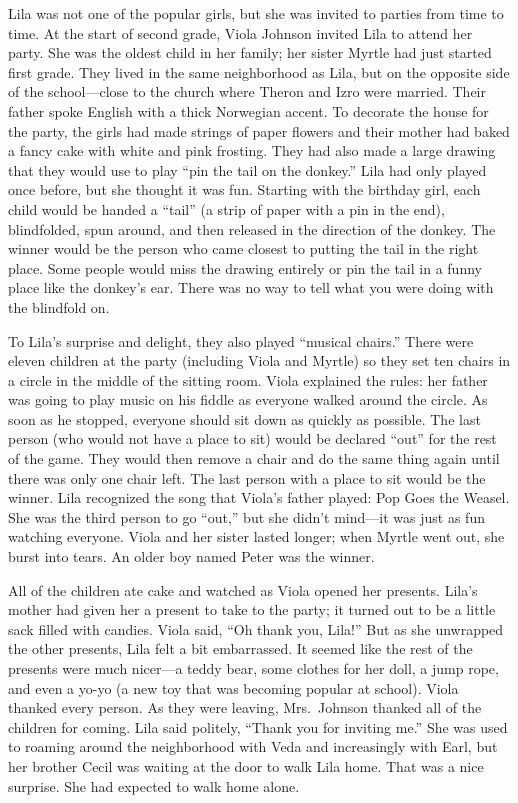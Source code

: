 \documentclass[
  letterpaper,
]{book}
\begin{document}
Lila was not one of the popular girls, but she was invited to parties
from time to time. At the start of second grade, Viola Johnson invited
Lila to attend her party. She was the oldest child in her family; her
sister Myrtle had just started first grade. They lived in the same
neighborhood as Lila, but on the opposite side of the school---close to
the church where Theron and Izro were married. Their father spoke
English with a thick Norwegian accent. To decorate the house for the
party, the girls had made strings of paper flowers and their mother had
baked a fancy cake with white and pink frosting. They had also made a
large drawing that they would use to play ``pin the tail on the
donkey.'' Lila had only played once before, but she thought it was fun.
Starting with the birthday girl, each child would be handed a ``tail''
(a strip of paper with a pin in the end), blindfolded, spun around, and
then released in the direction of the donkey. The winner would be the
person who came closest to putting the tail in the right place. Some
people would miss the drawing entirely or pin the tail in a funny place
like the donkey's ear. There was no way to tell what you were doing with
the blindfold on.

To Lila's surprise and delight, they also played ``musical chairs.''
There were eleven children at the party (including Viola and Myrtle) so
they set ten chairs in a circle in the middle of the sitting room. Viola
explained the rules: her father was going to play music on his fiddle as
everyone walked around the circle. As soon as he stopped, everyone
should sit down as quickly as possible. The last person (who would not
have a place to sit) would be declared ``out'' for the rest of the game.
They would then remove a chair and do the same thing again until there
was only one chair left. The last person with a place to sit would be
the winner. Lila recognized the song that Viola's father played: Pop
Goes the Weasel. She was the third person to go ``out,'' but she didn't
mind---it was just as fun watching everyone. Viola and her sister lasted
longer; when Myrtle went out, she burst into tears. An older boy named
Peter was the winner.

All of the children ate cake and watched as Viola opened her presents.
Lila's mother had given her a present to take to the party; it turned
out to be a little sack filled with candies. Viola said, ``Oh thank you,
Lila!'' But as she unwrapped the other presents, Lila felt a bit
embarrassed. It seemed like the rest of the presents were much nicer---a
teddy bear, some clothes for her doll, a jump rope, and even a yo-yo (a
new toy that was becoming popular at school). Viola thanked every
person. As they were leaving, Mrs.~Johnson thanked all of the children
for coming. Lila said politely, ``Thank you for inviting me.'' She was
used to roaming around the neighborhood with Veda and increasingly with
Earl, but her brother Cecil was waiting at the door to walk Lila home.
That was a nice surprise. She had expected to walk home alone.
\end{document}
